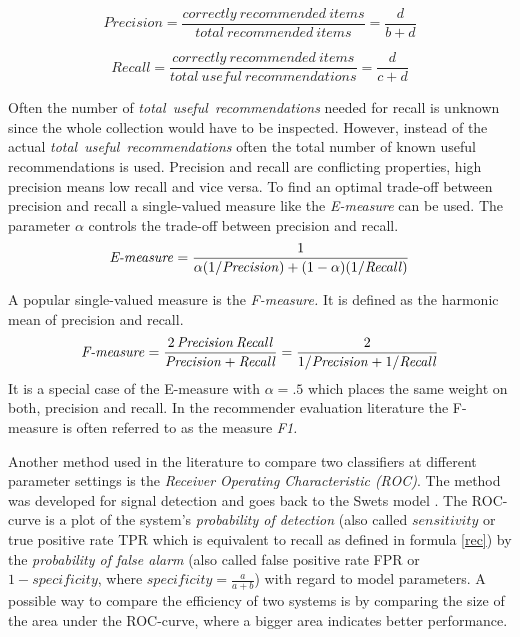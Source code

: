 \documentclass[nojss]{jss}
\begin{document}
\begin{equation} 
\mathit{Precision} = \frac{\mathit{correctly\ recommended\ items}}{\mathit{total\ recommended\ items}}
= \frac{d}{b+d}
\label{prec}
\end{equation} 

\begin{equation} 
\mathit{Recall} = \frac{\mathit{correctly\ recommended\ items}}{\mathit{total\ useful\ recommendations}}
= \frac{d}{c+d}
\label{rec}
\end{equation} 


Often the number of {\em total\ useful\ recommendations} needed for recall is
unknown since the whole collection would have to be inspected. However, instead
of the actual {\em total\ useful\ recommendations} often the total number of
known useful recommendations is used.  Precision and recall are
conflicting properties, high precision means low recall and vice versa. To find
an optimal trade-off between precision and recall a single-valued measure like
the {\em E-measure} \citep{recommender:Rijsbergen:1979} can be used.  
The parameter $\alpha$ controls the
trade-off between precision and recall.
\begin{equation} 
\mbox{\textit{E-measure}} = \frac{1}{\alpha(1/\mathit{Precision}) + (1-\alpha)(1/\mathit{Recall})}
\label{e-measure}
\end{equation} 

A popular single-valued measure is the {\em F-measure.} It is defined as the
harmonic mean of precision and recall.  
\begin{equation} 
\mbox{\textit{F-measure}} = \frac{2\, \mathit{Precision}\, \mathit{Recall}}{\mathit{Precision} + \mathit{Recall}} = 
\frac{2}{1/\mathit{Precision} + 1/\mathit{Recall}}
\label{f-measure}
\end{equation} 
It is
a special case of the E-measure with $\alpha=.5$ which places the same weight
on both, precision and recall.  In the recommender evaluation literature the
F-measure is often referred to as the measure {\em F1.}

Another method used in the literature to compare two classifiers at different 
parameter settings is the {\em Receiver Operating Characteristic (ROC)}.  
The method was developed for signal detection and goes back to the Swets model
\citep{recommender:Rijsbergen:1979}. The ROC-curve is a plot of the system's
{\em probability of detection} (also called $\mathit{sensitivity}$ or true
positive rate TPR which is equivalent to recall as defined in 
formula \ref{rec}) by the {\em probability of false alarm} 
(also called false positive rate FPR or
$1-\mathit{specificity}$, where
$\mathit{specificity} = \frac{a}{a+b}$) with
regard to model parameters.  A possible way to compare the efficiency of two
systems is by comparing the size of the area under the ROC-curve, where a
bigger area indicates better performance. 
\end{document}
